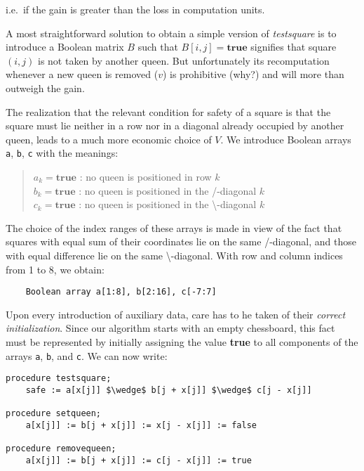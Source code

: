 i.e.\ if the gain is greater than the loss in computation units.

A most straightforward solution to obtain a simple version of \emph{testsquare}
is to introduce a Boolean matrix $B$ such that $B[i,j] = \textbf{true}$
signifies that square $(i, j)$ is not taken by another queen.  But
unfortunately its recomputation whenever a new queen is removed ($v$) is
prohibitive (why?) and will more than outweigh the gain.

The realization that the relevant condition for safety of a square is that the
square must lie neither in a row nor in a diagonal already occupied by another
queen, leads to a much more economic choice of $V$.  We introduce Boolean
arrays \verb|a|, \verb|b|, \verb|c| with the meanings:

\begin{quote}
$a_k = \textbf{true}$ : no queen is positioned in row $k$\\
$b_k = \textbf{true}$ : no queen is positioned in the /-diagonal $k$\\
$c_k = \textbf{true}$ : no queen is positioned in the \textbackslash-diagonal $k$\\
\end{quote}

The choice of the index ranges of these arrays is made in view of the fact that
squares with equal sum of their coordinates lie on the same /-diagonal, and
those with equal difference lie on the same \textbackslash-diagonal.  With row
and column indices from 1 to 8, we obtain:

\begin{lstlisting}
    Boolean array a[1:8], b[2:16], c[-7:7]
\end{lstlisting}

Upon every introduction of auxiliary data, care has to he taken of their
\emph{correct initialization}.  Since our algorithm starts with an empty
chessboard, this fact must be represented by initially assigning the value
\textbf{true} to all components of the arrays \verb|a|, \verb|b|, and \verb|c|.
We can now write:

\begin{lstlisting}
procedure testsquare;
    safe := a[x[j]] $\wedge$ b[j + x[j]] $\wedge$ c[j - x[j]]

procedure setqueen;
    a[x[j]] := b[j + x[j]] := x[j - x[j]] := false

procedure removequeen;
    a[x[j]] := b[j + x[j]] := c[j - x[j]] := true
\end{lstlisting}

